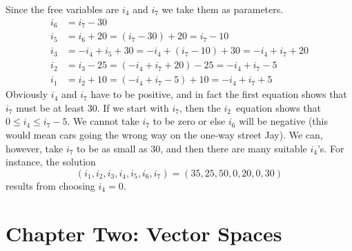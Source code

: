 \begin{ans}{6}
\begin{exparts}
\begin{equation*}
          \end{equation*}
          Since the free variables are $i_4$ and $i_7$ we take them as
          parameters.
          \begin{equation*}
          \begin{split}
            i_6  &=  i_7-30  \\
            i_5  &=  i_6+20=(i_7-30)+20=i_7-10 \\
            i_3  &=  -i_4+i_5+30=-i_4+(i_7-10)+30=-i_4+i_7+20 \\
            i_2  &=  i_3-25=(-i_4+i_7+20)-25=-i_4+i_7-5 \\
            i_1  &=  i_2+10=(-i_4+i_7-5)+10=-i_4+i_7+5
          \end{split}
          \tag{}\end{equation*}
          Obviously $i_4$ and $i_7$ have to be positive, and in fact
          the first equation shows that $i_7$ must be at least $30$.
          If we start with $i_7$, then the $i_2$~equation shows that
          $0\leq i_4\leq i_7-5$.
        \partsitem We cannot take $i_7$ to be zero or else $i_6$ will
          be negative (this would mean cars going the wrong way on the
          one-way street Jay).
          We can, however, take $i_7$ to be as small as $30$, and then
          there are many suitable $i_4$'s.
          For instance, the solution
          \begin{equation*}
            (i_1,i_2,i_3,i_4,i_5,i_6,i_7)
            =
            (35,25,50,0,20,0,30)
          \end{equation*}
          results from choosing $i_4=0$.
      \end{exparts}
    
\end{ans}
\chapter{Chapter Two: Vector Spaces}
